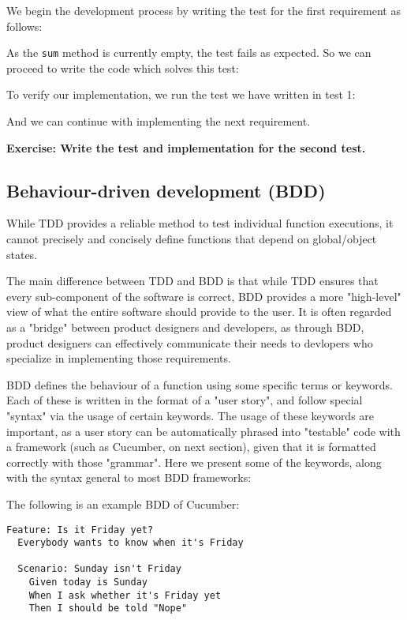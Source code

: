 We begin the development process by writing the test for the first requirement as follows:


As the \texttt{sum} method is currently empty, the test fails as expected. So we can proceed to write the code which solves this test:


To verify our implementation, we run the test we have written in test 1:


And we can continue with implementing the next requirement. 

\textbf{Exercise: Write the test and implementation for the second test.}

\subsection{Behaviour-driven development (BDD)}

While TDD provides a reliable method to test individual function executions, it cannot precisely and concisely define functions that depend on global/object states.

The main difference between TDD and BDD is that while TDD ensures that every sub-component of the software is correct, BDD provides a more "high-level" view of what the entire software should provide to the user. It is often regarded as a "bridge" between product designers and developers, as through BDD, product designers can effectively communicate their needs to devlopers who specialize in implementing those requirements. 

BDD defines the behaviour of a function using some specific terms or keywords. Each of these is written in the format of a "user story", and follow special "syntax" via the usage of certain keywords. The usage of these keywords are important, as a user story can be automatically phrased into "testable" code with a framework (such as Cucumber, on next section), given that it is formatted correctly with those "grammar". Here we present some of the keywords, along with the syntax general to most BDD frameworks:

The following is an example BDD of Cucumber:

\begin{lstlisting}[style=Cpp]
Feature: Is it Friday yet?
  Everybody wants to know when it's Friday

  Scenario: Sunday isn't Friday
    Given today is Sunday
    When I ask whether it's Friday yet
    Then I should be told "Nope"
\end{lstlisting}

